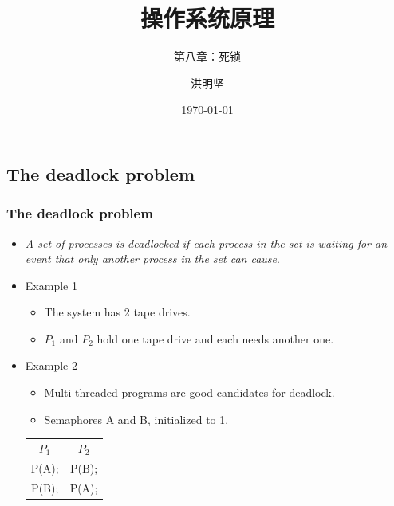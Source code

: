 \documentclass[CJKutf8,xcolor=pdftex,dvipsnames,table]{beamer}
\begin{document}
\begin{CJK*}{UTF8}{song}

  \title{ 操作系统原理}
  \subtitle{ 第八章：死锁}
	\author{ 洪明坚}
  \date{\today}


  \frame{\titlepage}


\section{The deadlock problem}

  \begin{frame}
  \frametitle{The deadlock problem} \pause
  \begin{itemize}
  \item{\emph{A set of processes is deadlocked if each process in the set is waiting for an event that only another process in the set can cause}.} \pause
  \item{Example 1} \pause
    \begin{itemize}
    \item{The system has 2 tape drives.} \pause
    \item{$P_1$ and $P_2$ hold one tape drive and each needs another one.} \pause
    \end{itemize}
  \item{Example 2} \pause
    \begin{itemize}
    \item{Multi-threaded programs are good candidates for deadlock.} \pause
    \item{Semaphores A and B, initialized to 1.} \pause
    \end{itemize}
    \centering
    \begin{tabular}{cc}
      $P_1$  \hspace{2cm}   &  \hspace{2cm}   $P_2$\\
      P(A);  \hspace{2cm}   &  \hspace{2cm}   P(B);\\
      P(B);  \hspace{2cm}   &  \hspace{2cm}   P(A);\\
    \end{tabular}
  \end{itemize}
  \end{frame}


\end{CJK*}
\end{document}
